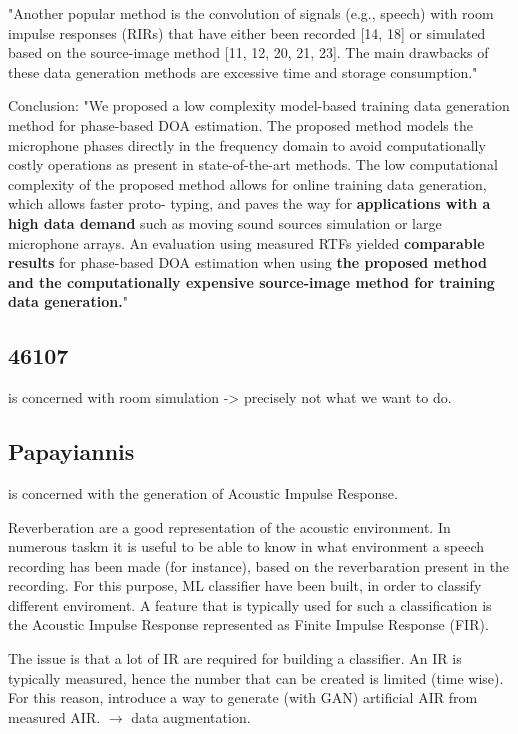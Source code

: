 \documentclass{article}
\begin{document}
"Another popular method is the convolution of signals (e.g., speech) with room impulse responses (RIRs) that have either been recorded [14, 18] or simulated based on the source-image method [11, 12, 20, 21, 23]. The main drawbacks of these data generation methods are excessive time and storage consumption."


Conclusion: 
"We proposed a low complexity model-based training data
generation method for phase-based DOA estimation. The
proposed method models the microphone phases directly
in the frequency domain to avoid computationally costly
operations as present in state-of-the-art methods. The low
computational complexity of the proposed method allows for
online training data generation, which allows faster proto-
typing, and paves the way for \textbf{applications with a high data
demand} such as moving sound sources simulation or large
microphone arrays. An evaluation using measured RTFs
yielded \textbf{comparable results} for phase-based DOA estimation
when using \textbf{the proposed method and the computationally
expensive source-image method for training data generation.}"


\subsection{46107}

\cite{46107} is concerned with room simulation -> precisely not what we want to do. 

\subsection{Papayiannis}

\cite{papayiannis2019data} is concerned with the generation of Acoustic Impulse Response.

Reverberation are a good representation of the acoustic environment. In numerous taskm it is useful to be able to know in what environment a speech recording has been made (for instance), based on the reverbaration present in the recording. For this purpose, ML classifier have been built, in order to classify different enviroment. A feature that is typically used for such a classification is the Acoustic Impulse Response represented as Finite Impulse Response (FIR).

The issue is that a lot of IR are required for building a classifier. An IR is typically measured, hence the number that can be created is limited (time wise). For this reason, \cite{papayiannis2019data} introduce a way to generate (with GAN) artificial AIR from measured AIR. $\rightarrow$ data augmentation.
\end{document}

